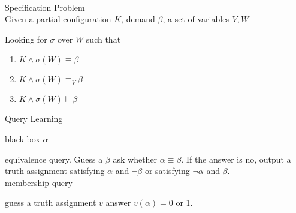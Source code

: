 \documentclass[12pt]{article}
\begin{document}
\ \\


Specification Problem\\

Given a partial configuration $K$, demand $\beta$, a set of variables $V,W$

Looking for $\sigma$ over $W$ such that

\begin{enumerate}
\item $K\wedge \sigma(W)\equiv \beta$

\item $K\wedge\sigma(W) \equiv_V\beta$

\item $K\wedge\sigma(W)\models \beta$
\end{enumerate}


Query Learning 

black box $\alpha$   

equivalence query. Guess a $\beta$ ask whether $\alpha\equiv \beta$. If the answer is no, output a truth assignment satisfying $\alpha$ and $\neg \beta$ or satisfying $\neg\alpha$ and $\beta$.\\

membership query

guess a truth assignment $v$ answer $v(\alpha)=0$ or 1. 

 
\end{document}
